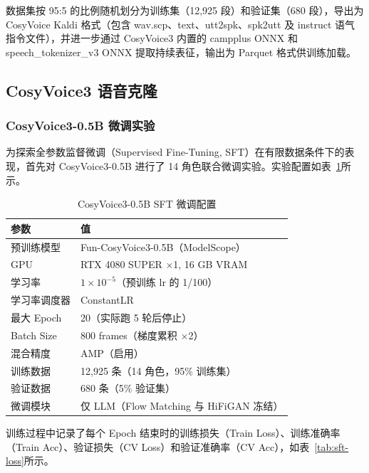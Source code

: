 \documentclass[12pt,a4paper]{article}
\begin{document}
数据集按 95:5 的比例随机划分为训练集（12,925 段）和验证集（680 段），导出为 CosyVoice Kaldi 格式（包含 wav.scp、text、utt2spk、spk2utt 及 instruct 语气指令文件），并进一步通过 CosyVoice3 内置的 campplus ONNX 和 speech\_tokenizer\_v3 ONNX 提取持续表征，输出为 Parquet 格式供训练加载。

\subsection{CosyVoice3 语音克隆}
\label{sec:cosyvoice}

\subsubsection{CosyVoice3-0.5B 微调实验}

为探索全参数监督微调（Supervised Fine-Tuning, SFT）在有限数据条件下的表现，首先对 CosyVoice3-0.5B\cite{du2025cosyvoice3} 进行了 14 角色联合微调实验。实验配置如表~\ref{tab:sft-config}所示。

\begin{table}[H]
\centering
\caption{CosyVoice3-0.5B SFT 微调配置}
\label{tab:sft-config}
\begin{tabular}{ll}
\toprule
\textbf{参数} & \textbf{值} \\
\midrule
预训练模型       & Fun-CosyVoice3-0.5B（ModelScope） \\
GPU             & RTX 4080 SUPER $\times$1, 16 GB VRAM \\
学习率           & $1 \times 10^{-5}$（预训练 lr 的 1/100） \\
学习率调度器      & ConstantLR \\
最大 Epoch       & 20（实际跑 5 轮后停止） \\
Batch Size       & 800 frames（梯度累积 $\times$2） \\
混合精度         & AMP（启用） \\
训练数据         & 12,925 条（14 角色，95\% 训练集） \\
验证数据         & 680 条（5\% 验证集） \\
微调模块         & 仅 LLM（Flow Matching 与 HiFiGAN 冻结） \\
\bottomrule
\end{tabular}
\end{table}

训练过程中记录了每个 Epoch 结束时的训练损失（Train Loss）、训练准确率（Train Acc）、验证损失（CV Loss）和验证准确率（CV Acc），如表~\ref{tab:sft-loss}所示。
\end{document}
